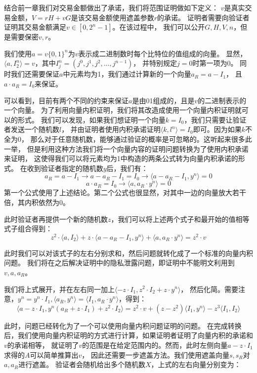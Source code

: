 结合前一章我们对交易金额做出了承诺，我们将范围证明做如下定义：
$v$是真实交易金额，$V=rH + vG$是该交易金额使用遮盖参数$r$的承诺。
证明者需要向验证者证明其交易金额满足$v\in[0,2^n-1]$。在该过程中，
我们可以公开$G, H, V, n$，但是需要保密$v, r$。

我们使用$a=v\{0,1\}^n$为$v$表示成二进制数时每个比特位的值组成的向量。
显然，$\langle a, I_2^n\rangle=v$，其中$I_j^n=(j^0, j^1, j^2, \dots, j^{n-1})$，
并特别规定$j=0$时第一项为0。
同时我们还需要保证$a$中元素均为1，我们通过计算新的一个向量$a_R=a-I_1$，
且$a\cdot a_R=I_0$来保证。

可以看到，目前有两个不同的约束来保证$a$是由01组成的，且是$v$的二进制表示的一个向量。
为了利用向量内积证明，我们将其改造成使用一个向量内积证明就可以的形式。
我们可以发现，如果我们想证明一个向量$k=I_0$，我们只需要让验证者发送一个随机数$l$，
并由证明者使用内积承诺证明$\langle k, l^n\rangle=I_0$即可。因为如果$k$不全为0，
那么对于任意随机数，能够通过验证的概率是可忽略的。这听起来很多此一举，
但是利用这种方法我们将一个向量内容的证明问题转换为了使用内积承诺来证明，
这使得我们可以将元素均为1中构造的两条公式转为向量内积承诺的形式。
在收到验证者指定的随机数$y$后，我们有：
%
$$a_R=a-I_1 \to a - a_R - I_1 = I_0 \to \langle a - a_R - I_1, y^n\rangle=0$$
%
$$a\cdot a_R=I_0 \to \langle a, a_R \cdot y^n\rangle=0$$
%
第一个公式使用了上述结论。第二个公式也很显然，对其中一边的向量放大若干倍，其内积依然为0。

此时验证者再提供一个新的随机数$z$，我们可以将上述两个式子和最开始的值相等式子组合得到：
%
$$z^2\cdot\langle a, I_2\rangle + z\cdot\langle a - a_R - I_1, y^n\rangle + \langle a, a_R \cdot y^n\rangle=z^2\cdot v$$

此时我们可以对该式子的左右分别求和，然后问题就转化成了一个标准的向量内积问题。
我们将在之后解决证明中的隐私泄露问题，即证明中不能明文利用到$v, a, a_R$。

我们将上式展开，并在左右同一加上$\langle -z\cdot I_1, z^2\cdot I_2 + z\cdot y^n\rangle$，
然后化简。需要注意，$y^n=y^n\cdot I_1, \langle a_R, y^n\rangle = \langle I_1, a_R\cdot y^n\rangle$，得到：
%
$$\langle a - z\cdot I_1, y^n(a_R + z\cdot I_1) + z^2\cdot I_2\rangle = z^2\cdot v + (z - z^2) \langle I_1, y^n\rangle - z^3\langle I_1, I_2\rangle$$

此时，问题已经转化为了一个可以使用向量内积问题证明的问题。
在完成转换后，我们使用向量内积证明的方式进行计算，如果证明者证明了向量内积的承诺和$v$的承诺相等，
就证明了$v$的范围是在给定范围内的。然而，此时左侧向量$a - z\cdot I_1$求得的$A$可以简单推算出$v$，
因此还需要一步遮盖方法。我们使用遮盖向量$s, s_R$对$a, a_R$进行遮盖。
验证者会随机给出多个随机数$X$，上式的左右向量分别变为：


